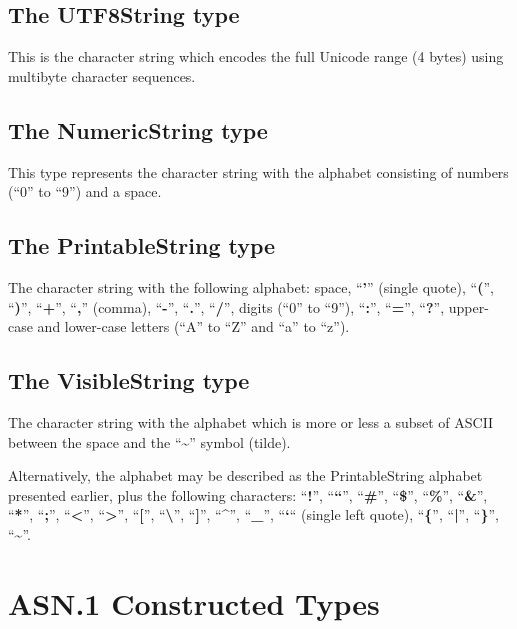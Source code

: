 \documentclass[english,oneside,12pt]{book}
\begin{document}
\subsection{The UTF8String type}

This is the character string which encodes the full Unicode range
(4 bytes) using multibyte character sequences.


\subsection{The NumericString type}

This type represents the character string with the alphabet consisting
of numbers (``0'' to ``9'') and a space.


\subsection{The PrintableString type}

The character string with the following alphabet: space, ``\textbf{'}''
(single quote), ``\textbf{(}'', ``\textbf{)}'', ``\textbf{+}'',
``\textbf{,}'' (comma), ``\textbf{-}'', ``\textbf{.}'', ``\textbf{/}'',
digits (``0'' to ``9''), ``\textbf{:}'', ``\textbf{=}'', ``\textbf{?}'',
upper-case and lower-case letters (``A'' to ``Z'' and ``a''
to ``z'').


\subsection{The VisibleString type}

The character string with the alphabet which is more or less a subset
of ASCII between the space and the ``\textbf{\textasciitilde{}}''
symbol (tilde).

Alternatively, the alphabet may be described as the PrintableString
alphabet presented earlier, plus the following characters: ``\textbf{!}'',
``\textbf{``}'', ``\textbf{\#}'', ``\textbf{\$}'', ``\textbf{\%}'',
``\textbf{\&}'', ``\textbf{*}'', ``\textbf{;}'', ``\textbf{<}'',
``\textbf{>}'', ``\textbf{{[}}'', ``\textbf{\textbackslash{}}'',
``\textbf{{]}}'', ``\textbf{\textasciicircum{}}'', ``\textbf{\_}'',
``\textbf{`}`` (single left quote), ``\textbf{\{}'', ``\textbf{|}'',
``\textbf{\}}'', ``\textbf{\textasciitilde{}}''.


\section{ASN.1 Constructed Types}
\end{document}
